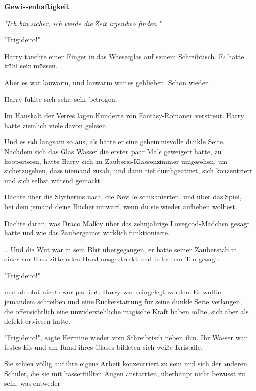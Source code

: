 

\hypertarget{gewissenhaftigkeit}{%

\textbf{Gewissenhaftigkeit}

\emph{"Ich bin sicher, ich werde die Zeit irgendwo finden."}

"Frigideiro!"

Harry tauchte einen Finger in das Wasserglas auf seinem Schreibtisch. Es hätte kühl sein müssen.

Aber es war lauwarm, und lauwarm war es geblieben. Schon wieder.

Harry fühlte sich sehr, sehr betrogen.

Im Haushalt der Verres lagen Hunderte von Fantasy-Romanen verstreut. Harry hatte ziemlich viele davon gelesen.

Und es sah langsam so aus, als hätte er eine geheimnisvolle dunkle Seite. Nachdem sich das Glas Wasser die ersten paar Male geweigert hatte, zu kooperieren, hatte Harry sich im Zauberei-Klassenzimmer umgesehen, um sicherzugehen, dass niemand zusah, und dann tief durchgeatmet, sich konzentriert und sich selbst wütend gemacht.

Dachte über die Slytherins nach, die Neville schikanierten, und über das Spiel, bei dem jemand deine Bücher umwarf, wenn du sie wieder aufheben wolltest.

Dachte daran, was Draco Malfoy über das zehnjährige Lovegood-Mädchen gesagt hatte und wie das Zaubergamot wirklich funktionierte.

.. Und die Wut war in sein Blut übergegangen, er hatte seinen Zauberstab in einer vor Hass zitternden Hand ausgestreckt und in kaltem Ton gesagt:

"Frigideiro!"

und absolut nichts war passiert. Harry war reingelegt worden. Er wollte jemandem schreiben und eine Rückerstattung für seine dunkle Seite verlangen, die offensichtlich eine unwiderstehliche magische Kraft haben sollte, sich aber als defekt erwiesen hatte.

"Frigideiro!", sagte Hermine wieder vom Schreibtisch neben ihm. Ihr Wasser war festes Eis und am Rand ihres Glases bildeten sich weiße Kristalle.

Sie schien völlig auf ihre eigene Arbeit konzentriert zu sein und sich der anderen Schüler, die sie mit hasserfüllten Augen anstarrten, überhaupt nicht bewusst zu sein, was entweder

}
